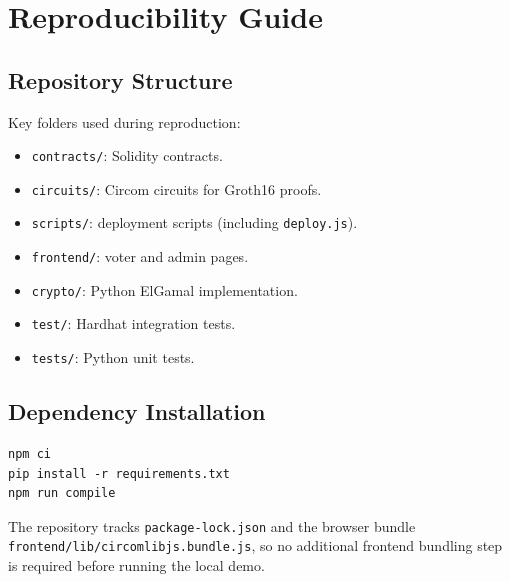 \chapter{Reproducibility Guide}
\label{app:reproducibility}
\begingroup
\justifying
\setlength{\parindent}{0pt}
\setlength{\parskip}{0.5\baselineskip}
\titlespacing{\chapter}{0pt}{0pt}{0pt}
\titlespacing{\section}{0pt}{0pt}{0pt}

\section{Repository Structure}
Key folders used during reproduction:
\begin{itemize}
    \item \texttt{contracts/}: Solidity contracts.
    \item \texttt{circuits/}: Circom circuits for Groth16 proofs.
    \item \texttt{scripts/}: deployment scripts (including \texttt{deploy.js}).
    \item \texttt{frontend/}: voter and admin pages.
    \item \texttt{crypto/}: Python ElGamal implementation.
    \item \texttt{test/}: Hardhat integration tests.
    \item \texttt{tests/}: Python unit tests.
\end{itemize}

\section{Dependency Installation}
\begin{verbatim}
npm ci
pip install -r requirements.txt
npm run compile
\end{verbatim}

The repository tracks \texttt{package-lock.json} and the browser bundle \texttt{frontend/lib/circomlibjs.bundle.js}, so no additional frontend bundling step is required before running the local demo.

